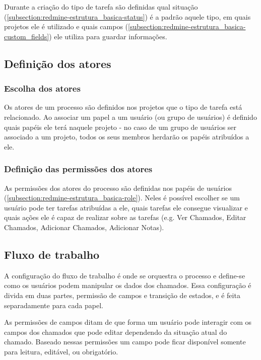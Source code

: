 Durante a criação do tipo de tarefa são definidas qual situação (\ref{subsection:redmine-estrutura_basica-status}) é a padrão aquele tipo, em quais projetos ele é utilizado e quais campos (\ref{subsection:redmine-estrutura_basica-custom_fields}) ele utiliza para guardar informações.


\subsection{Definição dos atores}\label{subsection:redmine-automatizar_processo-atores}

\subsubsection{Escolha dos atores}

Os atores de um processo são definidos nos projetos que o tipo de tarefa está relacionado. Ao associar um papel a um usuário (ou grupo de usuários) é definido quais papéis ele terá naquele projeto - no caso de um grupo de usuários ser associado a um projeto, todos os seus membros herdarão os papéis atribuídos a ele.

\subsubsection{Definição das permissões dos atores}

As permissões dos atores do processo são definidas nos papéis de usuários (\ref{subsection:redmine-estrutura_basica-role}). Neles é possível escolher se um usuário pode ter tarefas atribuídas a ele, quais tarefas ele consegue visualizar e quais ações ele é capaz de realizar sobre as tarefas (e.g. Ver Chamados, Editar Chamados, Adicionar Chamados, Adicionar Notas).

\subsection{Fluxo de trabalho}

A configuração do fluxo de trabalho é onde se orquestra o processo e define-se como os usuários podem manipular os dados dos chamados. Essa configuração é divida em duas partes, permissão de campos e transição de estados, e é feita separadamente para cada papel.

As permissões de campos ditam de que forma um usuário pode interagir com os campos dos chamados que pode editar dependendo da situação atual do chamado. Baseado nessas permissões um campo pode ficar disponível somente para leitura, editável, ou obrigatório.

